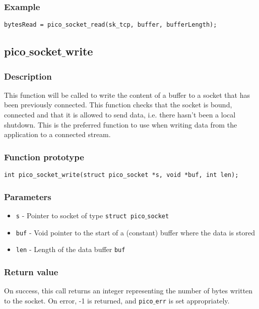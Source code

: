 \subsubsection*{Example}
\begin{verbatim}
bytesRead = pico_socket_read(sk_tcp, buffer, bufferLength);
\end{verbatim}



\subsection{pico$\_$socket$\_$write}

\subsubsection*{Description}
This function will be called to write the content of a buffer to a socket that has been previously connected.
This function checks that the socket is bound, connected and that it is allowed to send data, i.e. there hasn't been a local shutdown.
This is the preferred function to use when writing data from the application to a connected stream. 

\subsubsection*{Function prototype}
\begin{verbatim}
int pico_socket_write(struct pico_socket *s, void *buf, int len);
\end{verbatim}

\subsubsection*{Parameters}
\begin{itemize}[noitemsep]
\item \texttt{s} - Pointer to socket of type \texttt{struct pico$\_$socket}
\item \texttt{buf} - Void pointer to the start of a (constant) buffer where the data is stored
\item \texttt{len} - Length of the data buffer \texttt{buf} 
\end{itemize}

\subsubsection*{Return value}
On success, this call returns an integer representing the number of bytes written to the socket.
On error, -1 is returned, and \texttt{pico$\_$err} is set appropriately.

